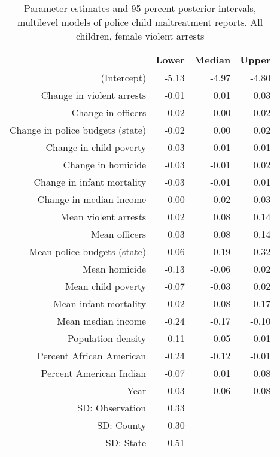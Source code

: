 \begin{table}[ht]
\centering
\begin{tabular}{rrrr}
  \hline
 & Lower & Median & Upper \\ 
  \hline
(Intercept) & -5.13 & -4.97 & -4.80 \\ 
  Change in violent arrests & -0.01 & 0.01 & 0.03 \\ 
  Change in officers & -0.02 & 0.00 & 0.02 \\ 
  Change in police budgets (state) & -0.02 & 0.00 & 0.02 \\ 
  Change in child poverty & -0.03 & -0.01 & 0.01 \\ 
  Change in homicide & -0.03 & -0.01 & 0.02 \\ 
  Change in infant mortality & -0.03 & -0.01 & 0.01 \\ 
  Change in median income & 0.00 & 0.02 & 0.03 \\ 
  Mean violent arrests & 0.02 & 0.08 & 0.14 \\ 
  Mean officers & 0.03 & 0.08 & 0.14 \\ 
  Mean police budgets (state) & 0.06 & 0.19 & 0.32 \\ 
  Mean homicide & -0.13 & -0.06 & 0.02 \\ 
  Mean child poverty & -0.07 & -0.03 & 0.02 \\ 
  Mean infant mortality & -0.02 & 0.08 & 0.17 \\ 
  Mean median income & -0.24 & -0.17 & -0.10 \\ 
  Population density & -0.11 & -0.05 & 0.01 \\ 
  Percent African American & -0.24 & -0.12 & -0.01 \\ 
  Percent American Indian & -0.07 & 0.01 & 0.08 \\ 
  Year & 0.03 & 0.06 & 0.08 \\ 
  SD: Observation & 0.33 &  &  \\ 
  SD: County & 0.30 &  &  \\ 
  SD: State & 0.51 &  &  \\ 
   \hline
\end{tabular}
\caption{Parameter estimates and 95 percent posterior intervals, multilevel models of 
             police child maltreatment reports. All children, female violent arrests} 
\end{table}
